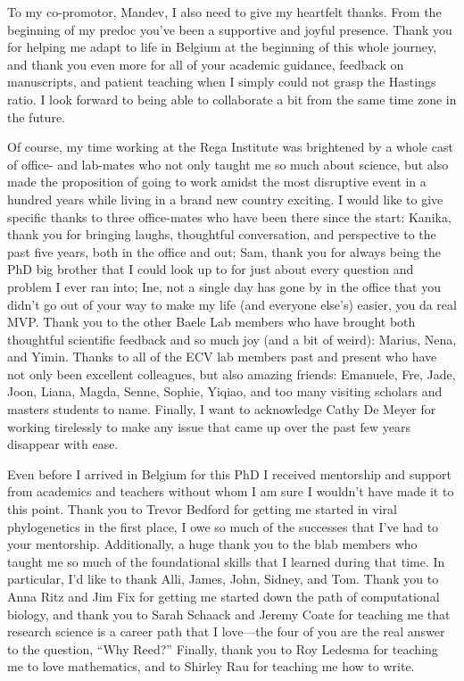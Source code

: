 To my co-promotor, Mandev, I also need to give my heartfelt thanks.
From the beginning of my predoc you've been a supportive and joyful presence.
Thank you for helping me adapt to life in Belgium at the beginning of this whole journey, and thank you even more for all of your academic guidance, feedback on manuscripts, and patient teaching when I simply could not grasp the Hastings ratio.
I look forward to being able to collaborate a bit from the same time zone in the future.

Of course, my time working at the Rega Institute was brightened by a whole cast of office- and lab-mates who not only taught me so much about science, but also made the proposition of going to work amidst the most disruptive event in a hundred years while living in a brand new country exciting.
I would like to give specific thanks to three office-mates who have been there since the start: Kanika, thank you for bringing laughs, thoughtful conversation, and perspective to the past five years, both in the office and out; Sam, thank you for always being the PhD big brother that I could look up to for just about every question and problem I ever ran into; Ine, not a single day has gone by in the office that you didn't go out of your way to make my life (and everyone else's) easier, you da real MVP.
Thank you to the other Baele Lab members who have brought both thoughtful scientific feedback and so much joy (and a bit of weird): Marius, Nena, and Yimin.
Thanks to all of the ECV lab members past and present who have not only been excellent colleagues, but also amazing friends: Emanuele, Fre, Jade, Joon, Liana, Magda, Senne, Sophie, Yiqiao, and too many visiting scholars and masters students to name.
Finally, I want to acknowledge Cathy De Meyer for working tirelessly to make any issue that came up over the past few years disappear with ease.

Even before I arrived in Belgium for this PhD I received mentorship and support from academics and teachers without whom I am sure I wouldn't have made it to this point.
Thank you to Trevor Bedford for getting me started in viral phylogenetics in the first place, I owe so much of the successes that I've had to your mentorship.
Additionally, a huge thank you to the blab members who taught me so much of the foundational skills that I learned during that time.
In particular, I'd like to thank Alli, James, John, Sidney, and Tom.
Thank you to Anna Ritz and Jim Fix for getting me started down the path of computational biology, and thank you to Sarah Schaack and Jeremy Coate for teaching me that research science is a career path that I love---the four of you are the real answer to the question, ``Why Reed?''
Finally, thank you to Roy Ledesma for teaching me to love mathematics, and to Shirley Rau for teaching me how to write.

